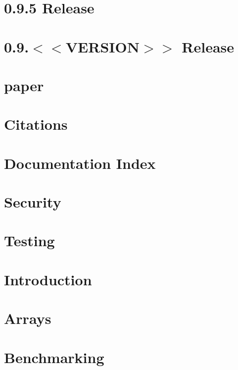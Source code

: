 \documentclass[twoside]{book}
\newcommand{\+}{\discretionary{\mbox{\scriptsize$\hookleftarrow$}}{}{}}
\begin{document}
\chapter{0.9.5 Release}
\label{doc_news_2021-04-11_0_9_5_md}

\chapter{0.9.$<$$<$V\+E\+R\+S\+I\+ON$>$$>$ Release}
\label{doc_news__preparation_next_release_md}

\chapter{paper}
\label{md_doc_paper_paper}

\chapter{Citations}
\label{doc_paper_README_md}

\chapter{Documentation Index}
\label{doc_README_md}

\chapter{Security}
\label{doc_SECURITY_md}

\chapter{Testing}
\label{doc_TESTING_md}

\chapter{Introduction}
\label{doc_tutorials_application-integration_md}

\chapter{Arrays}
\label{doc_tutorials_arrays_md}

\chapter{Benchmarking}
\label{doc_tutorials_benchmarking_md}

\end{document}
